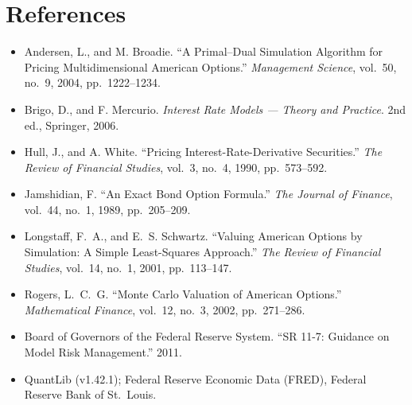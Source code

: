 \documentclass[11pt]{article}
\begin{document}
\section*{References}
\small
\begin{itemize}[nosep,leftmargin=1.2em]
  \item Andersen, L., and M. Broadie. ``A Primal--Dual Simulation Algorithm for Pricing
        Multidimensional American Options.'' \emph{Management Science}, vol.~50, no.~9,
        2004, pp.~1222--1234.
  \item Brigo, D., and F. Mercurio. \emph{Interest Rate Models --- Theory and Practice}.
        2nd ed., Springer, 2006.
  \item Hull, J., and A. White. ``Pricing Interest-Rate-Derivative Securities.''
        \emph{The Review of Financial Studies}, vol.~3, no.~4, 1990, pp.~573--592.
  \item Jamshidian, F. ``An Exact Bond Option Formula.'' \emph{The Journal of Finance},
        vol.~44, no.~1, 1989, pp.~205--209.
  \item Longstaff, F.~A., and E.~S. Schwartz. ``Valuing American Options by Simulation:
        A Simple Least-Squares Approach.'' \emph{The Review of Financial Studies},
        vol.~14, no.~1, 2001, pp.~113--147.
  \item Rogers, L.~C.~G. ``Monte Carlo Valuation of American Options.''
        \emph{Mathematical Finance}, vol.~12, no.~3, 2002, pp.~271--286.
  \item Board of Governors of the Federal Reserve System. ``SR 11-7: Guidance on Model
        Risk Management.'' 2011.
  \item QuantLib (v1.42.1); Federal Reserve Economic Data (FRED), Federal Reserve Bank of
            St.\ Louis.
\end{itemize}
\end{document}
